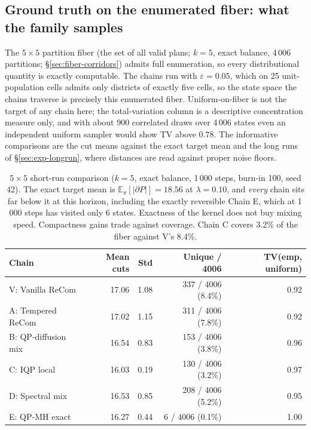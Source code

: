 \documentclass[11pt]{article}
\newcommand{\E}{\mathbb{E}}
\begin{document}
\subsection{Ground truth on the enumerated fiber: what the family samples}\label{sec:exp-5x5}

The $5 \times 5$ partition fiber (the set of all valid plans; $k = 5$, exact balance, 4\,006
partitions; \S\ref{sec:fiber-corridors}) admits full enumeration, so
every distributional quantity is exactly computable. The chains run
with $\varepsilon = 0.05$, which on 25 unit-population cells admits
only districts of exactly five cells, so the state space the chains
traverse is precisely this enumerated fiber. Uniform-on-fiber is not the target of any chain here; the
total-variation column is a descriptive concentration measure only,
and with about 900 correlated draws over 4\,006 states even an
independent uniform sampler would show TV above $0.78$. The
informative comparisons are the cut means against the exact target
mean and the long runs of \S\ref{sec:exp-longrun}, where distances
are read against proper noise floors.

\begin{table}[htbp]
\centering
\small
\begin{tabular}{lrrrr}
\toprule
Chain & Mean cuts & Std & Unique / 4006 & TV(emp, uniform) \\
\midrule
V: Vanilla ReCom     & 17.06 & 1.08 & 337 / 4006 (8.4\%) & 0.92 \\
A: Tempered ReCom    & 17.02 & 1.15 & 311 / 4006 (7.8\%) & 0.92 \\
B: QP-diffusion mix  & 16.54 & 0.83 & 153 / 4006 (3.8\%) & 0.96 \\
C: IQP local         & 16.03 & 0.19 & 130 / 4006 (3.2\%) & 0.97 \\
D: Spectral mix      & 16.53 & 0.85 & 208 / 4006 (5.2\%) & 0.95 \\
E: QP-MH exact       & 16.27 & 0.44 & \phantom{00}6 / 4006 (0.1\%) & 1.00 \\
\bottomrule
\end{tabular}
\caption{$5 \times 5$ short-run comparison ($k = 5$, exact balance,
  1\,000 steps, burn-in 100, seed 42). The exact target mean is
  $\E_\pi[|\partial P|] = 18.56$ at $\lambda = 0.10$, and \emph{every}
  chain sits far below it at this horizon, including the exactly
  reversible Chain E, which at 1\,000 steps has visited only 6 states. Exactness of the kernel does not buy mixing speed. Compactness
  gains trade against coverage. Chain C covers 3.2\% of the fiber against
  V's 8.4\%.}\label{tab:5x5-headline}
\end{table}
\end{document}
